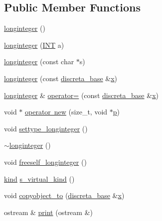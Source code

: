 \subsection*{Public Member Functions}
\begin{DoxyCompactItemize}
\item 
\mbox{\hyperlink{classlonginteger_a24b89f33d73b2cfb7776d236fea6c61f}{longinteger}} ()
\item 
\mbox{\hyperlink{classlonginteger_ad7548243519fe9770b13f00d9ce62643}{longinteger}} (\mbox{\hyperlink{galois_8h_a09fddde158a3a20bd2dcadb609de11dc}{I\+NT}} a)
\item 
\mbox{\hyperlink{classlonginteger_a46c003f48c7bb112056651dae89c8e72}{longinteger}} (const char $\ast$s)
\item 
\mbox{\hyperlink{classlonginteger_a30553f5083f01e86aae9e00630852617}{longinteger}} (const \mbox{\hyperlink{classdiscreta__base}{discreta\+\_\+base}} \&\mbox{\hyperlink{alphabet2_8_c_a6150e0515f7202e2fb518f7206ed97dc}{x}})
\item 
\mbox{\hyperlink{classlonginteger}{longinteger}} \& \mbox{\hyperlink{classlonginteger_a73681df1cab8ee88c85617574939fd0c}{operator=}} (const \mbox{\hyperlink{classdiscreta__base}{discreta\+\_\+base}} \&\mbox{\hyperlink{alphabet2_8_c_a6150e0515f7202e2fb518f7206ed97dc}{x}})
\item 
void $\ast$ \mbox{\hyperlink{classlonginteger_abbeec081da2c8cb237da0e0980e4919a}{operator new}} (size\+\_\+t, void $\ast$\mbox{\hyperlink{alphabet2_8_c_a533391314665d6bf1b5575e9a9cd8552}{p}})
\item 
void \mbox{\hyperlink{classlonginteger_ae5f811ece8df31b9ff114368a18e1dc5}{settype\+\_\+longinteger}} ()
\item 
\mbox{\hyperlink{classlonginteger_a6749d325fbff19a485dfa479f65afdb1}{$\sim$longinteger}} ()
\item 
void \mbox{\hyperlink{classlonginteger_a82006f4b7c6bf897de0387497e16c219}{freeself\+\_\+longinteger}} ()
\item 
\mbox{\hyperlink{discreta_8h_aaf25ee7e2306d78c74ec7bc48f092e81}{kind}} \mbox{\hyperlink{classlonginteger_ab5c97c64a923bc2bd270c998d1d2f283}{s\+\_\+virtual\+\_\+kind}} ()
\item 
void \mbox{\hyperlink{classlonginteger_ae894d5c96d74d0c19a09527956a14493}{copyobject\+\_\+to}} (\mbox{\hyperlink{classdiscreta__base}{discreta\+\_\+base}} \&\mbox{\hyperlink{alphabet2_8_c_a6150e0515f7202e2fb518f7206ed97dc}{x}})
\item 
ostream \& \mbox{\hyperlink{classlonginteger_a21d99160318418ba5bc8318254d2caf8}{print}} (ostream \&)

\end{DoxyCompactItemize}
